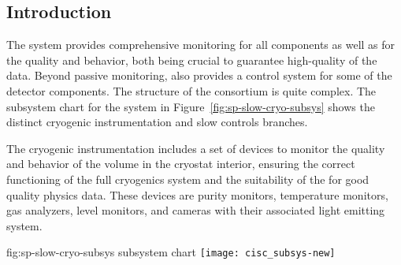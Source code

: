 \subsection{Introduction}
\label{sec:fddp-slow-cryo-intro}



The  system provides 
comprehensive monitoring for all  components as well as for the \lar quality and behavior, both being crucial
to guarantee high-quality of the data. Beyond passive monitoring,  also provides a control system for some of the detector components. 
The structure of the  consortium is quite complex. The subsystem chart
for the  system in Figure~\ref{fig:sp-slow-cryo-subsys} shows the distinct 
 cryogenic instrumentation and slow controls branches. 
 
 The cryogenic instrumentation includes a set of devices 
to monitor the quality and behavior of the \lar volume in the cryostat interior, ensuring the correct functioning of
the full cryogenics system and the suitability of the  for good quality physics data. These devices are 
purity monitors, temperature monitors, gas analyzers, \lar level monitors, and cameras with their associated
light emitting system.



\begin{dunefigure}{fig:sp-slow-cryo-subsys}
{ subsystem chart}
\texttt{[image: cisc\_subsys-new]}  %
\end{dunefigure}



